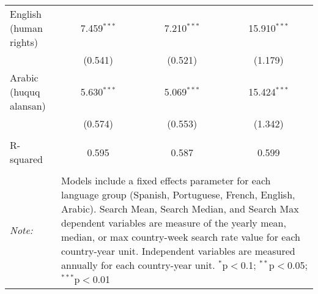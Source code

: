 \begin{table}[!htbp]
\begin{tabular}{@{\extracolsep{5pt}}lccc}
  English (human rights) & 7.459$^{***}$ & 7.210$^{***}$ & 15.910$^{***}$ \\ 
  & (0.541) & (0.521) & (1.179) \\ 
  Arabic (huquq alansan) & 5.630$^{***}$ & 5.069$^{***}$ & 15.424$^{***}$ \\ 
  & (0.574) & (0.553) & (1.342) \\ 
 \hline \\[-1.8ex] 
R-squared  & 0.595 & 0.587 & 0.599 \\ 
\hline 
\hline \\[-1.8ex] 
\textit{Note:}  & \multicolumn{3}{l}{\parbox[t]{8cm}{Models include a fixed effects parameter for each language group (Spanish, Portuguese, French, English, Arabic). Search Mean, Search Median, and Search Max dependent variables are measure of the yearly mean, median, or max country-week search rate value for each country-year unit. Independent variables are measured annually for each country-year unit. $^{*}$p$<$0.1; $^{**}$p$<$0.05; $^{***}$p$<$0.01}} \\ 
\end{tabular} 
\end{table} 
